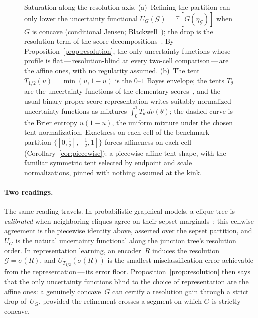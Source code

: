 \documentclass{article}
\theoremstyle{plain}
\theoremstyle{definition}
\newcommand{\E}{\mathbb{E}}
\begin{document}
\begin{figure}[ht]
{%
}
\caption{Saturation along the resolution axis. (a)~Refining the
partition can only lower the uncertainty functional
$U_G(\mathcal{G})=\E[G(\eta_{\mathcal{G}})]$ when $G$ is concave
(conditional Jensen; Blackwell~\cite{Blackwell1953}); the drop is the
resolution term of the score
decompositions~\cite{Murphy1973,Brocker2009,DGJ2021}. By
Proposition~\ref{prop:resolution}, the only uncertainty functions
whose profile is flat\,---\,resolution-blind at every two-cell
comparison\,---\,are the affine ones, with no regularity assumed.
(b)~The tent $T_{1/2}(u)=\min(u,1-u)$ is the $0$--$1$ Bayes envelope;
the tents $T_\theta$ are the uncertainty functions of the elementary
scores~\cite{Schervish1989,EGJK2016}, and the usual binary proper-score representation writes suitably normalized uncertainty functions as mixtures $\int_0^1 T_\theta\,d\nu(\theta)$;
the dashed curve is the Brier entropy $u(1-u)$, the uniform mixture under the chosen tent normalization.
Exactness on each cell of the benchmark partition
$\{[0,\tfrac12],[\tfrac12,1]\}$ forces affineness on each cell
(Corollary~\ref{cor:piecewise}): a piecewise-affine tent shape, with the familiar symmetric tent selected by endpoint and scale normalizations, pinned with nothing
assumed at the kink.}
\label{fig:resolution}
\end{figure}

\paragraph{Two readings.}
The same reading travels. In probabilistic graphical models, a clique
tree is \emph{calibrated} when neighboring cliques agree on their
sepset marginals~\cite{KollerFriedman2009}; this cellwise agreement
is the piecewise identity above, asserted over the sepset partition,
and $U_G$ is the natural uncertainty functional along the junction
tree's resolution order. In representation learning, an encoder~$R$
induces the resolution $\mathcal{G}=\sigma(R)$, and
$U_{T_{1/2}}(\sigma(R))$ is the smallest misclassification error
achievable from the representation\,---\,its error floor.
Proposition~\ref{prop:resolution} then says that the only uncertainty
functions blind to the choice of representation are the affine ones:
a genuinely concave~$G$ can certify a resolution gain through a strict drop of~$U_G$, provided the refinement crosses a segment on which $G$ is strictly concave.
\end{document}
